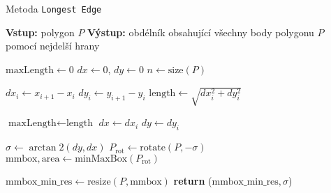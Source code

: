 \begin{algorithm}
    \caption{Metoda \texttt{Longest Edge}}
    \begin{algorithmic}[1]
        \STATE \textbf{Vstup:} polygon $P$
        \STATE \textbf{Výstup:} obdélník obsahující všechny body polygonu $P$ pomocí nejdelší hrany
        
        \STATE $\text{maxLength} \gets 0$
        \STATE $dx \gets 0$, $dy \gets 0$
        \STATE $n \gets \text{size}(P)$
        
            \STATE $dx_i \gets x_{i+1} - x_i$
            \STATE $dy_i \gets y_{i+1} - y_i$
            \STATE $\text{length} \gets \sqrt{dx_i^2 + dy_i^2}$
            
                \STATE $\text{maxLength} \gets \text{length}$
                \STATE $dx \gets dx_i$
                \STATE $dy \gets dy_i$
            \ENDIF
        \ENDFOR
        
        \STATE $\sigma \gets \arctan2(dy, dx)$
        \STATE $P_{\text{rot}} \gets \text{rotate}(P, -\sigma)$
        \STATE $\text{mmbox}, \text{area} \gets \text{minMaxBox}(P_{\text{rot}})$
        
        \STATE $\text{mmbox\_min\_res} \gets \text{resize}(P, \text{mmbox})$
        \STATE \textbf{return} ($\text{mmbox\_min\_res}, \sigma$)
    \end{algorithmic}
\end{algorithm}